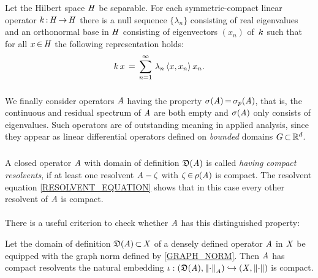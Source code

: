\documentclass[11pt,twoside]{article}
\begin{document}
\begin{theorem}\label{DISCRETE_SPECTRAL_THEOREM}
Let the Hilbert space $\mathit{H}$ be separable.
For each symmetric-compact linear operator $k {\,:\,} \mathit{H} {\,\to\,} \mathit{H}$
there is a null sequence $\{\lambda_n\}$ consisting of real eigenvalues
and an ortho\-normal base in $\mathit{H}$
consisting of eigenvectors $(x_n)$ of $\,k$
such that for all $x {\,\in\,} \mathit{H}$ the following representation holds:
\begin{equation}\label{HILBERT_SCHMIDT_REPRESENTATION}
k \,x \,=\,
\sum_{n=1}^{\infty} \, \lambda_n \, \langle x,x_n \rangle \, x_n.
\end{equation}
\end{theorem}

\subsubsection*{} %
We finally consider operators $\mathit{A}$
having the property $\sigma(\mathit{A}) {\,=\,} \sigma_p(\mathit{A})$,
that is,
the continuous and residual spectrum of $\mathit{A}$ are both empty
and $\sigma(\mathit{A})$ only consists of eigenvalues.
Such operators are of outstanding meaning in applied analysis,
since they appear as linear differential operators
defined on \textit{bounded} domains $G {\,\subset\,} {\mathbb{R}}^d$.

\subparagraph*{}
A closed operator $\mathit{A}$ with domain of definition $\mathfrak{D}(\mathit{A})$
is called \textit{having compact resolvents},
if at least one resolvent $\mathit{A} -\zeta$ with $\zeta {\,\in\,} \rho(\mathit{A})$ is compact.
The resolvent equation \eqref{RESOLVENT_EQUATION} shows
that in this case {every} other resolvent of $\mathit{A}$ is compact.

\paragraph*{}
There is a useful criterion to check
whether $\mathit{A}$ has this distinguished property:

\begin{theorem}\label{CRITERION_FOR_OPERATORS_HAVING_PURE_POINT_SPECTRUM}
Let the domain of definition $\mathfrak{D}(\mathit{A}) {\,\subset\,} \mathit{X}$
of a densely defined operator $\mathit{A}$ in $\mathit{X}$
be equipped with the graph norm defined by \eqref{GRAPH_NORM}.
Then $\mathit{A}$ has compact resolvents
\iff the natural embedding
$\iota:
( \mathfrak{D}(\mathit{A}) ,\left\lVert \cdot \right\rVert_A )
\hookrightarrow
(\mathit{X},\left\lVert \cdot \right\rVert)$
is compact.
\end{theorem}
\end{document}
